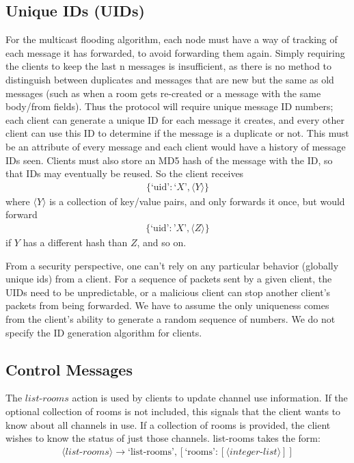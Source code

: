 \documentclass{article}
\begin{document}
\subsection{Unique IDs (UIDs)}
For the multicast flooding algorithm, each node must have a way of tracking of
each message it has forwarded, to avoid forwarding them again. Simply requiring
the clients to keep the last n messages is insufficient, as there is no method
to distinguish between duplicates and messages that are new but the same as old
messages (such as when a room gets re-created or a message with the same
body/from fields). Thus the protocol will require unique message ID numbers;
each client can generate a unique ID for each message it creates, and every
other client can use this ID to determine if the message is a duplicate or not.
This must be an attribute of every message and each client would have a history
of message IDs seen. Clients must also store an MD5 hash of the message with the
ID, so that IDs may eventually be reused. So the client receives
\begin{align*}
\{\text{`uid'}:\text{`}X\text{'},\langle Y\rangle\}
\end{align*}
where $\langle Y\rangle$  is a collection of key/value pairs, and only forwards
it once, but would forward 
\begin{align*}
\{\text{`uid'}:\text{'}X\text{'},\langle Z\rangle\}
\end{align*}
if $Y$ has a different hash than $Z$, and so on.

From a security perspective, one can't rely on any particular behavior (globally
unique ids) from a client. For a sequence of packets sent by a given client, the
UIDs need to be unpredictable, or a malicious client can stop another client's
packets from being forwarded. We have to assume the only uniqueness comes from
the client's ability to generate a random sequence of numbers. We do not specify
the ID generation algorithm for clients.
\subsection{Control Messages}

The $list\text{-}rooms$ action is used by clients to update channel use information. If
the optional collection of rooms is not included, this signals that the client
wants to know about all channels in use. If a collection of rooms is provided,
the client wishes to know the status of just those channels. list-rooms takes
the form:
\begin{align*}
\langle list\text{-}rooms\rangle  \rightarrow \text{`list-rooms'} , [ \text{`rooms'} :
[\langle integer\text{-}list\rangle ] ]
\end{align*}
\end{document}
